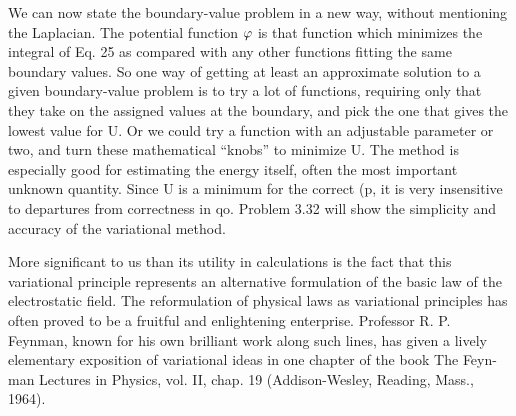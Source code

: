 We can now state the boundary-value problem in a new way,
without mentioning the Laplacian. The potential function $\varphi$ is that
function which minimizes the integral of Eq. 25 as compared with any
other functions fitting the same boundary values. So one way of getting
at least an approximate solution to a given boundary-value
problem is to try a lot of functions, requiring only that they take on
the assigned values at the boundary, and pick the one that gives the
lowest value for U. Or we could try a function with an adjustable
parameter or two, and turn these mathematical ``knobs'' to minimize
U. The method is especially good for estimating the energy
itself, often the most important unknown quantity. Since U is a
minimum for the correct (p, it is very insensitive to departures from
correctness in qo. Problem 3.32 will show the simplicity and accuracy
of the variational method.

More significant to us than its utility in calculations is the fact that
this variational principle represents an alternative formulation of the
basic law of the electrostatic field. The reformulation of physical
laws as variational principles has often proved to be a fruitful and
enlightening enterprise. Professor R. P. Feynman, known for his
own brilliant work along such lines, has given a lively elementary
exposition of variational ideas in one chapter of the book The Feyn-
man Lectures in Physics, vol. II, chap. 19 (Addison-Wesley, Reading,
Mass., 1964).

\fi
